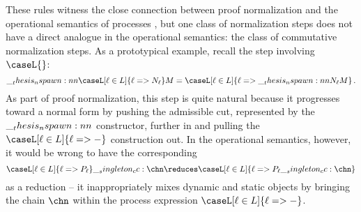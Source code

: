 

These rules witness the close connection between proof normalization and the operational semantics of processes%
, but one class of normalization steps does not have a direct analogue in the operational semantics: the class of commutative normalization steps.
As a prototypical example, recall the step involving $\caseL{}$:
\begin{equation*}
  \nspawn{\caseL[\ell \in L]{\ell => N_{\ell}}}{M} = \caseL[\ell \in L]{\ell => \nspawn{N_{\ell}}{M}}
  \,.
\end{equation*}
As part of proof normalization, this step is quite natural because it progresses toward a normal form by pushing the admissible cut, represented by the $\nspawn{}{}$ constructor, further in and pulling the $\caseL[\ell \in L]{\ell => {-}}$ construction out.
In the operational semantics, however, it would be wrong to have the corresponding
\begin{equation*}
  \caseL[\ell \in L]{\ell => P_{\ell}} \cc \chn \reduces \caseL[\ell \in L]{\ell => P_{\ell} \cc \chn}
\end{equation*}
as a reduction -- it inappropriately mixes dynamic and static objects by bringing the chain $\chn$ within the process expression $\caseL[\ell \in L]{\ell => {-}}$.

